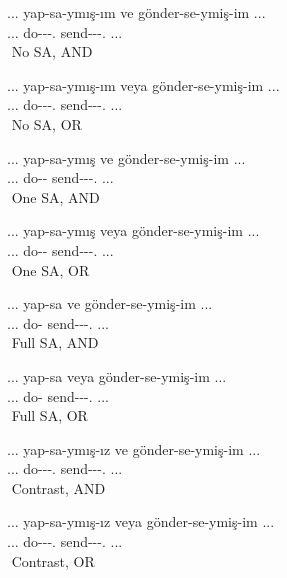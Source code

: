 \begin{exe}
\ex \label{selfpaceditems}
    \begin{xlist}
     \ex \gll ... yap-sa-ymış-ım ve gönder-se-ymiş-im ... \\ ... do-{\Cond}-{\Prf}-{\First}.{\Sg} {\And} send-{\Cond}-{\Prf}-{\First}.{\Sg} ... \\
     \glt ${}$ \hfill No SA, AND
     
     \ex \gll ... yap-sa-ymış-ım veya gönder-se-ymiş-im ... \\ ... do-{\Cond}-{\Prf}-{\First}.{\Sg} {\And} send-{\Cond}-{\Prf}-{\First}.{\Sg} ... \\
     \glt ${}$ \hfill No SA, OR
     
     \ex \gll ... yap-sa-ymış ve gönder-se-ymiş-im ... \\ ... do-{\Cond}-{\Prf} {\And} send-{\Cond}-{\Prf}-{\First}.{\Sg} ... \\
     \glt ${}$ \hfill One SA, AND
     
     \ex \gll ... yap-sa-ymış veya gönder-se-ymiş-im ... \\ ... do-{\Cond}-{\Prf} {\And} send-{\Cond}-{\Prf}-{\First}.{\Sg} ... \\
     \glt ${}$ \hfill One SA, OR
     
     \ex \gll ... yap-sa ve gönder-se-ymiş-im ... \\ ... do-{\Cond} {\And} send-{\Cond}-{\Prf}-{\First}.{\Sg} ... \\
     \glt ${}$ \hfill Full SA, AND
     
     \ex \gll ... yap-sa veya gönder-se-ymiş-im ... \\ ... do-{\Cond} {\And} send-{\Cond}-{\Prf}-{\First}.{\Sg} ... \\
     \glt ${}$ \hfill Full SA, OR
     
     \ex \gll ... yap-sa-ymış-ız ve gönder-se-ymiş-im ... \\ ... do-{\Cond}-{\Prf}-{\First}.{\Pl} {\And} send-{\Cond}-{\Prf}-{\First}.{\Sg} ... \\
     \glt ${}$ \hfill Contrast, AND
     
     \ex \gll ... yap-sa-ymış-ız veya gönder-se-ymiş-im ... \\ ... do-{\Cond}-{\Prf}-{\First}.{\Pl} {\And} send-{\Cond}-{\Prf}-{\First}.{\Sg} ... \\
     \glt ${}$ \hfill Contrast, OR
     
    \end{xlist}
\end{exe}